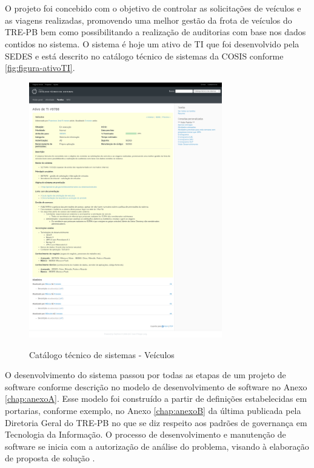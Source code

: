 
\chapter{\imprimirtitulo}
\label{chap:atividadesRealizadas}
O projeto \imprimirtitulo \space foi concebido com o objetivo de controlar as solicitações de veículos e as viagens realizadas, promovendo uma melhor gestão da frota de veículos do TRE-PB bem como possibilitando a realização de auditorias com base nos dados contidos no sistema.
O sistema é hoje um ativo de TI que foi desenvolvido pela SEDES e está descrito no catálogo técnico de sistemas da COSIS conforme \autoref{fig:figura-ativoTI}. 

\begin{figure}[!htb]
    \centering
    \caption{Catálogo técnico de sistemas - Veículos}
    \includegraphics[width=0.75\textwidth]{./dados/figuras/veiculos-ativoTI}
    \label{fig:figura-ativoTI}
\end{figure}

O desenvolvimento do sistema passou por todas as etapas de um projeto de software conforme descrição no modelo de desenvolvimento de software no Anexo \ref{chap:anexoA}. Esse modelo foi construído a partir de definições estabelecidas em portarias, conforme exemplo, no Anexo \ref{chap:anexoB} da última publicada pela Diretoria Geral do TRE-PB no que se diz respeito aos padrões de governança em Tecnologia da Informação.
O processo de desenvolvimento e manutenção de software se inicia com a autorização de análise do problema, visando à elaboração de proposta de solução  \cite[p.~2]{Portaria37:2017}.

